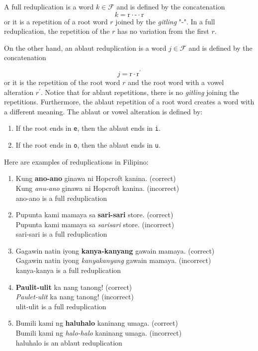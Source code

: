 A full reduplication is a word \(k \in \mathcal{F}\) and is defined by the concatenation
\[
      k = \text{r} \cdot \text{-} \cdot \text{r}
\]
or it is a repetition of a root word \(r\) joined by the \textit{gitling} "-".
In a full reduplication, the repetition of the \(r\) has no variation from the first \(r\).

On the other hand, an ablaut reduplication is a word \(j \in \mathcal{F}\) and is defined by the
concatenation

\[
      j = \text{r} \cdot \text{r$^\prime$}
\]
or it is the repetition of the root word \(r\) and the root word with a vowel alteration \(r^\prime\). Notice
that for ablaut repetitions, there is no \textit{gitling} joining the repetitions. Furthermore,
the ablaut repetition of a root word creates a word with a different meaning. The ablaut or vowel
alteration is defined by:

\begin{enumerate}
    \item If the root ends in \texttt{e}, then the ablaut ends in \texttt{i}. 
    \item If the root ends in \texttt{o}, then the ablaut ends in \texttt{u}.
\end{enumerate}

\begin{example}
      Here are examples of reduplications in Filipino:
\end{example}
\begin{enumerate}
      \item Kung \textbf{ano-ano} ginawa ni Hopcroft kanina. (correct) \\
            Kung \textit{anu-ano} ginawa ni Hopcroft kanina. (incorrect) \\
            ano-ano is a full reduplication
      \item Pupunta kami mamaya sa \textbf{sari-sari} store. (correct) \\
            Pupunta kami mamaya sa \textit{sarisari} store. (incorrect) \\
            sari-sari is a full reduplication
      \item Gagawin natin iyong \textbf{kanya-kanyang} gawain mamaya. (correct) \\
            Gagawin natin iyong \textit{kanyakanyang} gawain mamaya. (incorrect) \\
            kanya-kanya is a full reduplication
      \item \textbf{Paulit-ulit} ka nang tanong! (correct) \\
            \textit{Paulet-ulit} ka nang tanong! (incorrect) \\
            ulit-ulit is a full reduplication
      \item Bumili kami ng \textbf{haluhalo} kaninang umaga. (correct) \\
            Bumili kami ng \textit{halo-halo} kaninang umaga. (incorrect) \\
            haluhalo is an ablaut reduplication
\end{enumerate}

